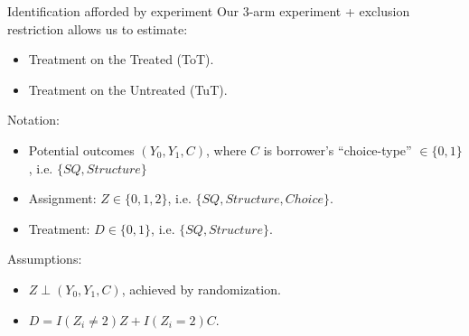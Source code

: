 \documentclass[9pt, aspectratio=169]{beamer}
\begin{document}
 
\begin{frame}{Identification afforded by experiment}
Our 3-arm experiment + exclusion restriction allows us to estimate: 
\begin {itemize}
 \item Treatment on the Treated (ToT).
 \item Treatment on the Untreated (TuT).
\end{itemize}
\vspace{.1in}
Notation: 
\begin{itemize}
    \item Potential outcomes $(Y_0,Y_1,C)$, where $C$ is borrower's ``choice-type'' $\in\{0,1\}$, i.e. $\{SQ,Structure\}$
    \item Assignment: $Z \in \{0,1,2\}$, i.e. $\{SQ,Structure,Choice\}$.  
    \item Treatment: $D \in \{0,1\} $, i.e. $\{SQ,Structure\}$.
\end{itemize}
\vspace{.1in}
Assumptions:
\begin{itemize}
     \item $Z \perp (Y_0,Y_1,C)$, achieved by randomization.
    \item $D = I(Z_i \neq 2) Z + I(Z_i=2) C$.
\end{itemize}
\end{frame}
\end{document}
